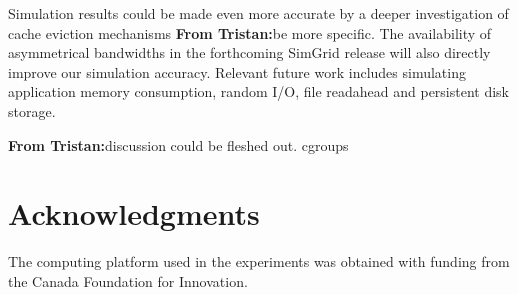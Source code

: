 \documentclass[conference]{IEEEtran}
\newcommand{\tristan}[1]{\color{orange}\textbf{From Tristan:}#1\color{black}}
\newcommand{\simgrid}{SimGrid\xspace}
\begin{document}
        Simulation results could be made even more accurate by a deeper
        investigation of cache eviction mechanisms \tristan{be more
        specific}. The availability of asymmetrical bandwidths in the
        forthcoming \simgrid release will also directly improve our
        simulation accuracy. Relevant future work includes simulating
        application memory consumption, random I/O, file readahead and
        persistent disk storage.

        \tristan{discussion could be fleshed out. cgroups}

        \section{Acknowledgments}
The computing platform used in the experiments was obtained with funding
from the Canada Foundation for Innovation.



\end{document}
